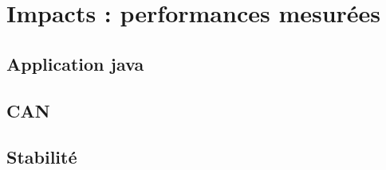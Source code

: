 \section{Impacts : performances mesurées}
\subsection{Application java}
\begin{frame}

\end{frame}

\subsection{CAN}

\begin{frame}
\end{frame}

\subsection{Stabilité}
\begin{frame}
	
\end{frame}


